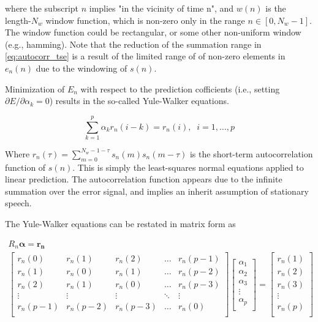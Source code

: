 \noindent
where the subscript $n$ implies "in the vicinity of time n", and $w(n)$ is the length-$N_w$ window function, which is non-zero only in the range $n \in [0, N_w-1]$. The window function could be rectangular, or some other non-uniform window (e.g., hamming). Note that the reduction of the summation range in \ref{eq:autocorr_tse} is a result of the limited range of of non-zero elements in $e_n(n)$ due to the windowing of $s(n)$.

Minimization of $E_n$ with respect to the prediction cofficients (i.e., setting $\partial E/\partial \alpha_k=0$) results in the so-called Yule-Walker equations. 

\begin{equation}
	\sum_{k=1}^{p} \alpha_k r_n(i-k) = r_n(i), \;\; i=1,\dots,p
\end{equation}

\noindent
Where $r_n(\tau) = \sum_{m=0}^{N_w-1-\tau}s_n(m)s_n(m-\tau)$ is the short-term autocorrelation function of $s(n)$. This is simply the least-squares normal equations applied to linear prediction. The autocorrelation function appears due to the infinite summation over the error signal, and implies an inherit assumption of stationary speech.

The Yule-Walker equations can be restated in matrix form as

\begin{eqnarray}
	R_n \boldsymbol{\alpha} = \boldsymbol{r_n} \\
   	\begin{bmatrix} 
	   	r_n(0)    & r_n(1)      & r_n(2)     & \dots     & r_n(p-1)  \\
	   	r_n(1)     & r_n(0)      & r_n(1)     & \dots     & r_n(p-2)  \\
	   	r_n(2)     & r_n(1)      & r_n(0)     & \dots     & r_n(p-3)  \\
	   	\vdots     & \vdots      & \vdots     & \ddots  & \vdots  \\
	   	r_n(p-1)  & r_n(p-2)  & r_n(p-3) & \dots    & r_n(0)  \\
	\end{bmatrix} 
	\begin{bmatrix}
		\alpha_1 \\
		\alpha_2 \\
		\alpha_3 \\
		\vdots    \\
		\alpha_p \\
	\end{bmatrix}
	=
	\begin{bmatrix}
		r_n(1)  \\
		r_n(2) \\
		r_n(3) \\
		\vdots    \\
		r_n(p) \\
\end{bmatrix}
\end{eqnarray}

